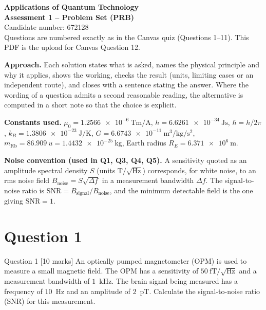 \documentclass[11pt]{article}
\newcommand{\sqHz}{\ensuremath{/\sqrt{\mathrm{Hz}}}}
\begin{document}
\begin{center}
{\Large\bfseries Applications of Quantum Technology\\[0.25em]
Assessment 1 -- Problem Set (PRB)\\[0.4em]}
{\large Candidate number: 672128}\\[0.3em]
{\small Questions are numbered exactly as in the Canvas quiz (Questions 1--11). This PDF is the upload for Canvas Question 12.}
\end{center}

\textbf{Approach.} Each solution states what is asked, names the physical principle and why it
applies, shows the working, checks the result (units, limiting cases or an independent route),
and closes with a sentence stating the answer. Where the wording of a question admits a second
reasonable reading, the alternative is computed in a short note so that the choice is explicit.

\textbf{Constants used.}
$\mu_0 = \SI{1.2566e-6}{\tesla\metre\per\ampere}$,
$h = \SI{6.6261e-34}{\joule\second}$, $\hbar = h/2\pi$,
$k_B = \SI{1.3806e-23}{\joule\per\kelvin}$,
$G = \SI{6.6743e-11}{\metre\cubed\per\kilogram\per\second\squared}$,
$m_{\mathrm{Rb}} = \SI{86.909}{u} = \SI{1.4432e-25}{\kilogram}$,
Earth radius $R_E = \SI{6.371e6}{\metre}$.

\textbf{Noise convention (used in Q1, Q3, Q4, Q5).} A sensitivity quoted as an amplitude
spectral density $S$ (units \si{\tesla}\sqHz) corresponds, for white noise, to an rms noise field
$B_{\mathrm{noise}} = S\sqrt{\Delta f}$ in a measurement bandwidth $\Delta f$. The signal-to-noise
ratio is $\mathrm{SNR} = B_{\mathrm{signal}}/B_{\mathrm{noise}}$, and the minimum detectable field is
the one giving $\mathrm{SNR}=1$.

\section{Question 1}

\begin{problembox}{Question 1 \hfill [10 marks]}
An optically pumped magnetometer (OPM) is used to measure a small magnetic field. The OPM has a
sensitivity of $50~\mathrm{fT}/\sqrt{\mathrm{Hz}}$ and a measurement bandwidth of $1$~kHz. The brain
signal being measured has a frequency of $10$~Hz and an amplitude of $2$~pT. Calculate the
signal-to-noise ratio (SNR) for this measurement.
\end{problembox}
\end{document}
